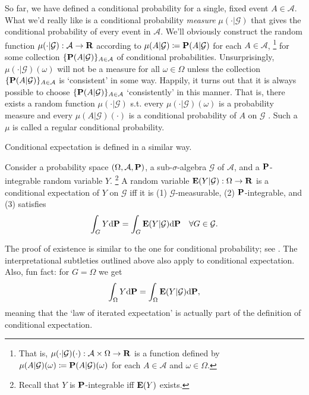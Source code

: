 \documentclass[11pt,letterpaper,reqno,oneside]{article}
\begin{document}
So far, we have defined a conditional probability for a single, fixed event $A \in \mathcal{A}$. What we'd really like is a conditional probability \emph{measure} $\mu(\cdot|\mathcal{G})$ that gives the conditional probability of every event in $\mathcal{A}$. We'll obviously construct the random function $\mu(\cdot|\mathcal{G}) : \mathcal{A} \to \mathbf{R}$ according to $\mu(A|\mathcal{G}) \coloneqq \mathbf{P}(A|\mathcal{G})$ for each $A \in \mathcal{A}$,%
	\footnote{That is, $\mu(\cdot|\mathcal{G})(\cdot) : \mathcal{A} \times \Omega \to \mathbf{R}$ is a function defined by $\mu(A|\mathcal{G})(\omega) \coloneqq \mathbf{P}(A|\mathcal{G})(\omega)$ for each $A \in \mathcal{A}$ and $\omega \in \Omega$.}
for some collection $\{ \mathbf{P}(A|\mathcal{G}) \}_{A \in \mathcal{A}}$ of conditional probabilities. Unsurprisingly, $\mu(\cdot|\mathcal{G})(\omega)$ will not be a measure for all $\omega \in \Omega$ unless the collection $\{ \mathbf{P}(A|\mathcal{G}) \}_{A \in \mathcal{A}}$ is `consistent' in some way. Happily, it turns out that it is always possible to choose $\{ \mathbf{P}(A|\mathcal{G}) \}_{A \in \mathcal{A}}$ `consistently' in this manner. That is, there exists a random function $\mu(\cdot|\mathcal{G})$ s.t. every $\mu(\cdot|\mathcal{G})(\omega)$ is a probability measure and every $\mu(A|\mathcal{G})(\cdot)$ is a conditional probability of $A$ on $\mathcal{G}$ \parencite[][Theorem 33.3]{Billingsley1995}. Such a $\mu$ is called a regular conditional probability.


Conditional expectation is defined in a similar way.
%
\begin{definition}
	Consider a probability space $(\Omega,\mathcal{A},\mathbf{P})$, a sub-$\sigma$-algebra $\mathcal{G}$ of $\mathcal{A}$, and a $\mathbf{P}$-integrable random variable $Y$.%
		\footnote{Recall that $Y$ is $\mathbf{P}$-integrable iff $\mathbf{E}(Y)$ exists.}
	A random variable $\mathbf{E}(Y|\mathcal{G}) : \Omega \to \mathbf{R}$ is a conditional expectation of $Y$ on $\mathcal{G}$ iff it is (1) $\mathcal{G}$-measurable, (2) $\mathbf{P}$-integrable, and (3) satisfies
	\begin{equation*}
		\int_G Y \mathrm{d} \mathbf{P}
		= \int_G \mathbf{E}(Y|\mathcal{G}) \mathrm{d} \mathbf{P} 
		\quad\forall G \in \mathcal{G} .
	\end{equation*}
\end{definition}

The proof of existence is similar to the one for conditional probability; see \textcite[][Proposition 13.1.7]{Rosenthal2006}. The interpretational subtleties outlined above also apply to conditional expectation. Also, fun fact: for $G=\Omega$ we get
%
\begin{equation*}
	\int_\Omega Y \mathrm{d} \mathbf{P} = \int_\Omega \mathbf{E}(Y|\mathcal{G}) \mathrm{d} \mathbf{P} ,
\end{equation*}
%
meaning that the `law of iterated expectation' is actually part of the definition of conditional expectation.
\end{document}
